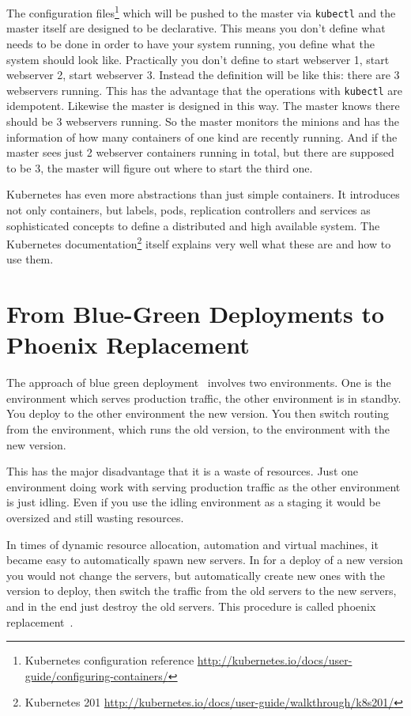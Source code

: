 \documentclass[runningheads,a4paper]{llncs}
\begin{document}
The configuration files\footnote{Kubernetes configuration reference \url{http://kubernetes.io/docs/user-guide/configuring-containers/}} which will be pushed to the master via \texttt{kubectl} and the master itself are designed to be declarative. This means you don't define what needs to be done in order to have your system running, you define what the system should look like. Practically you don't define to start webserver 1, start webserver 2, start webserver 3. Instead the definition will be like this: there are 3 webservers running. This has the advantage that the operations with \texttt{kubectl} are idempotent. Likewise the master is designed in this way. The master knows there should be 3 webservers running. So the master monitors the minions and has the information of how many containers of one kind are recently running. And if the master sees just 2 webserver containers running in total, but there are supposed to be 3, the master will figure out where to start the third one.

Kubernetes has even more abstractions than just simple containers. It introduces not only containers, but labels, pods, replication controllers and services as sophisticated concepts to define a distributed and high available system. The Kubernetes documentation\footnote{Kubernetes 201 \url{http://kubernetes.io/docs/user-guide/walkthrough/k8s201/}} itself explains very well what these are and how to use them.

\section{From Blue-Green Deployments to Phoenix Replacement}

The approach of blue green deployment~\cite[find page]{continuous_delivery} involves two environments. One is the environment which serves production traffic, the other environment is in standby. You deploy to the other environment the new version. You then switch routing from the environment, which runs the old version, to the environment with the new version.

This has the major disadvantage that it is a waste of resources. Just one environment doing work with serving production traffic as the other environment is just idling. Even if you use the idling environment as a staging it would be oversized and still wasting
resources.

In times of dynamic resource allocation, automation and virtual machines, it became easy to automatically spawn new servers. In for a deploy of a new version you would not change the servers, but automatically create new ones with the version to deploy, then switch the traffic from the old servers to the new servers, and in the end just destroy the old servers. This procedure is called phoenix replacement~\cite[p. 283]{infra_as_code}.
\end{document}
